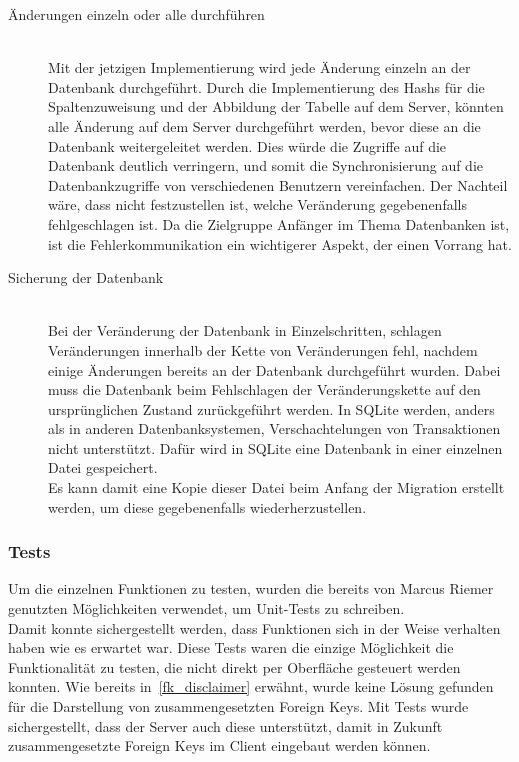 \begin{description}
\item[Änderungen einzeln oder alle durchführen] \hfill\\
Mit der jetzigen Implementierung wird jede Änderung einzeln an der Datenbank durchgeführt. Durch die Implementierung des Hashs für die Spaltenzuweisung und der Abbildung der Tabelle auf dem Server, könnten alle Änderung auf dem Server durchgeführt werden, bevor diese an die Datenbank weitergeleitet werden. Dies würde die Zugriffe auf die Datenbank deutlich verringern, und somit die Synchronisierung auf die Datenbankzugriffe von verschiedenen Benutzern vereinfachen. Der Nachteil wäre, dass nicht festzustellen ist, welche Veränderung gegebenenfalls fehlgeschlagen ist. Da die Zielgruppe Anfänger im Thema Datenbanken ist, ist die Fehlerkommunikation ein wichtigerer Aspekt, der einen Vorrang hat.  

\item[Sicherung der Datenbank] \hfill\\
Bei der Veränderung der Datenbank in Einzelschritten, schlagen Veränderungen innerhalb der Kette von Veränderungen fehl, nachdem einige Änderungen bereits an der Datenbank durchgeführt wurden. Dabei muss die Datenbank beim Fehlschlagen der Veränderungskette auf den ursprünglichen Zustand zurückgeführt werden. In SQLite werden, anders als in anderen Datenbanksystemen, Verschachtelungen von Transaktionen nicht unterstützt. Dafür wird in SQLite eine Datenbank in einer einzelnen Datei gespeichert. \\ 
Es kann damit eine Kopie dieser Datei beim Anfang der Migration erstellt werden, um diese gegebenenfalls wiederherzustellen.

\end{description}

\subsubsection{Tests}
\label{subsubsec04:server_testing}
Um die einzelnen Funktionen zu testen, wurden die bereits von Marcus Riemer genutzten Möglichkeiten verwendet, um Unit-Tests zu schreiben. \\
Damit konnte sichergestellt werden, dass Funktionen sich in der Weise verhalten haben wie es erwartet war. Diese Tests waren die einzige Möglichkeit die Funktionalität zu testen, die nicht direkt per Oberfläche gesteuert werden konnten. Wie bereits in~\ref{fk_disclaimer} erwähnt, wurde keine Lösung gefunden für die Darstellung von zusammengesetzten Foreign Keys. Mit Tests wurde sichergestellt, dass der Server auch diese unterstützt, damit in Zukunft zusammengesetzte Foreign Keys im Client eingebaut werden können.

